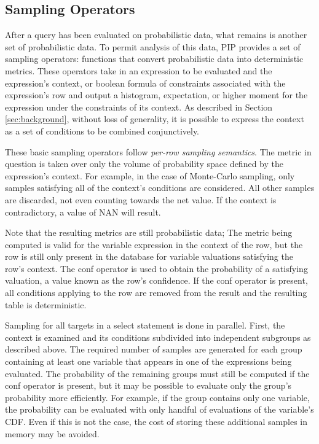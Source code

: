 \subsection{Sampling Operators}
After a query has been evaluated on probabilistic data, what remains is another set of probabilistic data.  To permit analysis of this data, PIP provides a set of sampling operators: functions that convert probabilistic data into deterministic metrics.  These operators take in an expression to be evaluated and the expression's context, or boolean formula of constraints associated with the expression's row and output a histogram, expectation, or higher moment for the expression under the constraints of its context.  As described in Section \ref{sec:background}, without loss of generality, it is possible to express the context as a set of conditions to be combined conjunctively.  

These basic sampling operators follow \textit{per-row sampling semantics}.  The metric in question is taken over only the volume of probability space defined by the expression's context.  For example, in the case of Monte-Carlo sampling, only samples satisfying all of the context's conditions are considered.  All other samples are discarded, not even counting towards the net value.  If the context is contradictory, a value of NAN will result.

Note that the resulting metrics are still probabilistic data; The metric being computed is valid for the variable expression in the context of the row, but the row is still only present in the database for variable valuations satisfying the row's context.  The conf operator is used to obtain the probability of a satisfying valuation, a value known as the row's confidence.  If the conf operator is present, all conditions applying to the row are removed from the result and the resulting table is deterministic.

Sampling for all targets in a select statement is done in parallel.  First, the context is examined and its conditions subdivided into independent subgroups as described above.  The required number of samples are generated for each group containing at least one variable that appears in one of the expressions being evaluated.  The probability of the remaining groups must still be computed if the conf operator is present, but it may be possible to evaluate only the group's probability more efficiently.  For example, if the group contains only one variable, the probability can be evaluated with only handful of evaluations of the variable's CDF.  Even if this is not the case, the cost of storing these additional samples in memory may be avoided.


